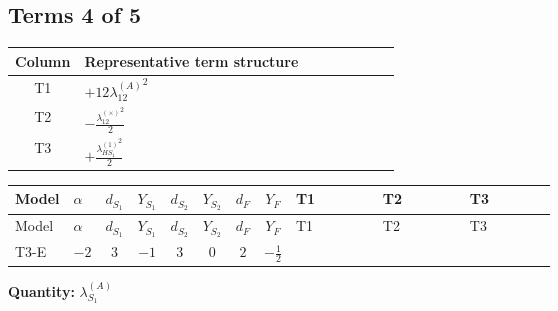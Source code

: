 \documentclass[8pt]{article}
\begin{document}
\begin{landscape}
\subsection*{Terms 4 of 5}
\begin{center}
\begin{tabular}{@{}c >{\raggedright\arraybackslash}p{0.82\linewidth}@{}}
\toprule
Column & Representative term structure \\
\midrule
T1 & \(\displaystyle +12 {\lambda_{12}^{(A)}}^2\) \\
\midrule
T2 & \(\displaystyle -\frac{{\lambda_{12}^{(\times)}}^2}{2}\) \\
\midrule
T3 & \(\displaystyle +\frac{{\lambda_{HS_1}^{(1)}}^2}{2}\) \\
\midrule
\bottomrule
\end{tabular}
\end{center}
\smallskip
\tiny
\begin{longtable}{@{}llcccccc >{\raggedright\arraybackslash}p{0.21\linewidth} >{\raggedright\arraybackslash}p{0.21\linewidth} >{\raggedright\arraybackslash}p{0.21\linewidth}@{}}
\toprule
Model & $\alpha$ & $d_{S_1}$ & $Y_{S_1}$ & $d_{S_2}$ & $Y_{S_2}$ & $d_F$ & $Y_F$ & T1 & T2 & T3 \\
\midrule
\endfirsthead
\toprule
Model & $\alpha$ & $d_{S_1}$ & $Y_{S_1}$ & $d_{S_2}$ & $Y_{S_2}$ & $d_F$ & $Y_F$ & T1 & T2 & T3 \\
\midrule
\endhead
T3-E & $-2$ & $3$ & $-1$ & $3$ & $0$ & $2$ & $-\frac{1}{2}$ & \scriptsize\adjustbox{max width=\linewidth}{$\begin{gathered} +12 {\lambda_{12}^{(A)}}^2\end{gathered}$} & \scriptsize\adjustbox{max width=\linewidth}{$\begin{gathered} -\frac{{\lambda_{12}^{(\times)}}^2}{2}\end{gathered}$} & \scriptsize\adjustbox{max width=\linewidth}{$\begin{gathered} +\frac{{\lambda_{HS_1}^{(1)}}^2}{2}\end{gathered}$} \\
\midrule
\bottomrule
\end{longtable}
\clearpage
\noindent\textbf{Quantity: }$\lambda_{S_1}^{(A)}$\par\smallskip

\end{landscape}
\end{document}
